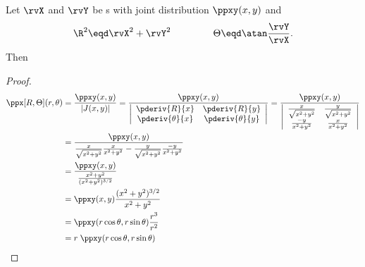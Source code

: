 \begin{proposition}
\label{prop:XY->RT}
Let $\rvX$ and $\rvY$ be s with joint distribution
$\ppxy(x,y)$ and
\[\R^2 \eqd\rvX^2 +\rvY^2 \hspace{10ex} \Theta \eqd \atan\frac{\rvY}{\rvX}. \]
Then
\end{proposition}
\begin{proof}
\begin{align*}
  \ppx[R,\Theta](r,\theta)
    &= \frac{\ppxy(x,y)}{|J(x,y)|}
     = \frac{\ppxy(x,y)}{
       \left|\begin{array}{cc}
         \pderiv{R}{x}      & \pderiv{R}{y}   \\
         \pderiv{\theta}{x} & \pderiv{\theta}{y}
       \end{array}\right|
       }
     = \frac{\ppxy(x,y)}{
       \left|\begin{array}{cc}
         \frac{ x}{\sqrt{x^2+y^2}}  & \frac{y}{\sqrt{x^2+y^2}}   \\
         \frac{-y}{x^2+y^2}         & \frac{x}{x^2+y^2}
       \end{array}\right|
       }
  \\&= \frac{\ppxy(x,y)}{
         \frac{x}{\sqrt{x^2+y^2}}\frac{x}{x^2+y^2}  -
         \frac{y}{\sqrt{x^2+y^2}}\frac{-y}{x^2+y^2}
       }
  \\&= \frac{\ppxy(x,y)}{
         \frac{x^2+y^2}{(x^2+y^2)^{3/2}}
       }
  \\&= \ppxy(x,y)\frac{(x^2+y^2)^{3/2}}{x^2+y^2}
  \\&= \ppxy(r\cos\theta,r\sin\theta)\frac{r^3}{r^2}
  \\&= r\;\ppxy(r\cos\theta,r\sin\theta)
\end{align*}
\end{proof}


